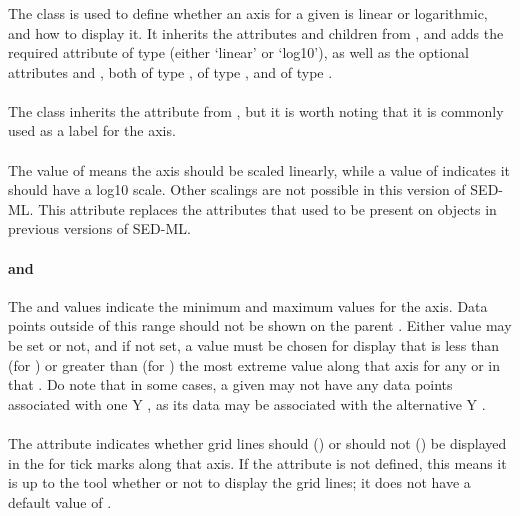 \subsubsection{}
\label{class:axis}
The \Axis class is used to define whether an axis for a given \Plot is linear or logarithmic, and how to display it.  It inherits the attributes and children from \SedBase, and adds the required attribute  of type \AxisType (either `linear' or `log10'), as well as the optional attributes  and , both of type ,  of type , and  of type \SIdRef.

\begin{blockChanged}
\paragraph*{}
The \Axis class inherits the  attribute from \SedBase, but it is worth noting that it is commonly used as a label for the axis.


\paragraph*{}
The  value of  means the axis should be scaled linearly, while a value of  indicates it should have a log10 scale.  Other scalings are not possible in this version of SED-ML.  This attribute replaces the  attributes that used to be present on \Curve objects in previous versions of SED-ML. 

\paragraph*{ and }
The  and  values indicate the minimum and maximum values for the axis.  Data points outside of this range should not be shown on the parent \Plot.  Either value may be set or not, and if not set, a value must be chosen for display that is less than (for ) or greater than (for ) the most extreme value along that axis for any \Curve or \Surface in that \Plot.  Do note that in some cases, a given \Curve may not have any data points associated with one Y \Axis, as its data may be associated with the alternative Y \Axis.

\paragraph*{}
The  attribute indicates whether grid lines should () or should not () be displayed in the \Plot for tick marks along that axis.  If the  attribute is not defined, this means it is up to the tool whether or not to display the grid lines; it does not have a default value of .


\end{blockChanged}
